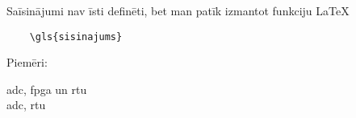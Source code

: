 \hspace*{5mm} 
Saīsinājumi nav īsti definēti, bet man patīk izmantot funkciju \LaTeX
\begin{verbatim}
    \gls{sisinajums}    
\end{verbatim} 
Piemēri:\par
\gls{adc}, \gls{fpga} un \gls{rtu} \lipsum[1-1]
\\
\gls{adc}, \gls{rtu}
\par
\lipsum[2-2]